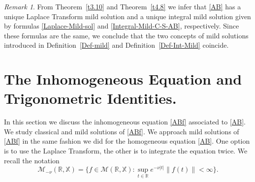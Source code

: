 \documentclass[11pt]{amsart}
\numberwithin{equation}{section}
\theoremstyle{remark}
\newtheorem{remark}[theorem]{Remark}
\theoremstyle{definition}
\newcommand\bX{{\mathbb X}}
\begin{document}
\begin{remark}\label{r4.9}
	From Theorem~\ref{t3.10} and Theorem~\ref{t4.8} we infer that \eqref{AB} has a unique Laplace Transform mild solution and a unique integral mild solution given by formulas \eqref{Laplace-Mild-sol} and \eqref{Integral-Mild-C-S-AB}, respectively. Since these formulas are the same, we conclude that the two concepts of mild solutions introduced in Definition~\ref{Def-mild} and Definition~\ref{Def-Int-Mild} coincide.
\end{remark}

\section{The Inhomogeneous Equation and Trigonometric Identities.}\label{s5}
In this section we discuss the inhomogeneous equation \eqref{ABf} associated to \eqref{AB}.
We study classical and mild solutions of \eqref{ABf}. We approach mild solutions of \eqref{ABf} in the same fashion we did  for the homogeneous equation \eqref{AB}. One option is to use the Laplace Transform, the other is to integrate the equation twice. We recall the notation
\begin{equation}\label{measurable-exp-grow}
	\mathcal{M}_{-\nu}(\mathbb{R},\bX)
	= \big\{ f \in \mathcal{M}(\mathbb{R},\bX) : \sup_{t \in \mathbb{R}} e^{-\nu|t|}\|f(t)\| < \infty \big\}. 
\end{equation}
\end{document}
